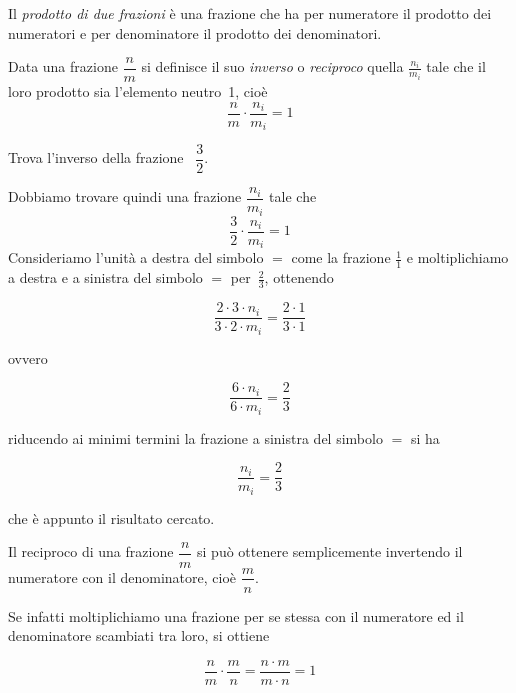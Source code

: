 \begin{definizione}
Il \emph{prodotto di due frazioni} è una frazione che ha per numeratore il prodotto dei numeratori
e per denominatore il prodotto dei denominatori.
\end{definizione}

\begin{center}
 
\end{center}

\ovalbox{\risolvii \ref{ese:3.52}, \ref{ese:3.53}, \ref{ese:3.54}, \ref{ese:3.55}, \ref{ese:3.56}}

\begin{definizione}
Data una frazione $\dfrac{n}{m}$ si definisce il suo \emph{inverso} o \emph{reciproco} quella $\frac{n_i}{m_i}$ tale che il loro prodotto sia l'elemento neutro~1, cioè
\[\frac{n}{m} \cdot \frac{n_i}{m_i} = 1\]
\end{definizione}

\begin{exrig}
\begin{esempio}
Trova l'inverso della frazione ~$\dfrac{3}{2}$.

Dobbiamo trovare quindi una frazione $\dfrac{n_i}{m_i}$ tale che
\[\frac{3}{2} \cdot \frac{n_i}{m_i} =1\]
Consideriamo l'unità a destra del simbolo $=$ come la frazione $\frac{1}{1}$ e moltiplichiamo a destra e a sinistra del simbolo $=$ per~$\frac{2}{3}$, ottenendo

\[\frac{2\cdot 3 \cdot n_i}{3\cdot 2 \cdot m_i} = \frac{2\cdot 1}{3\cdot 1}\]

\noindent ovvero

\[\frac{6 \cdot n_i}{6 \cdot m_i} = \frac{2}{3}\]

\noindent riducendo ai minimi termini la frazione a sinistra del simbolo $=$ si ha

\[\frac{n_i}{m_i} = \frac{2}{3}\]

\noindent che è appunto il risultato cercato.
\end{esempio}
\end{exrig}

\osservazione Il reciproco di una frazione $\dfrac{n}{m}$ si può ottenere semplicemente invertendo il numeratore con il denominatore, cioè $\dfrac{m}{n}$.

Se infatti moltiplichiamo una frazione per se stessa con il numeratore ed il denominatore scambiati tra loro, si ottiene

\[\frac{n}{m} \cdot \frac{m}{n} = \frac{n \cdot m}{m \cdot n} = 1\]

